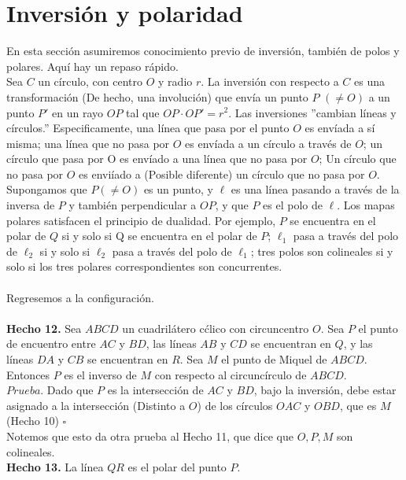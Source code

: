 \documentclass[11pt, a4paper]{article}
\begin{document}
	\setcounter{section}{6}
	\section{Inversi\'on y polaridad}
	En esta secci\'on asumiremos conocimiento previo de inversi\'on, tambi\'en de polos y polares. Aqu\'i hay un repaso r\'apido.
	\\
	Sea $C$ un c\'irculo, con centro $O$ y radio $r$. La inversi\'on con respecto a $C$ es una transformaci\'on (De hecho, una involuci\'on) que env\'ia un punto $P$ $(\ne O)$ a un punto $P'$ en un rayo $OP$ tal que $OP \cdot OP'=r^2$.
	\linebreak
	Las inversiones ''cambian l\'ineas y c\'irculos.'' Especificamente, una l\'inea que pasa por el punto $O$ es env\'iada a s\'i misma; una l\'inea que no pasa por $O$ es env\'iada a un c\'irculo a trav\'es de $O$; un c\'irculo que pasa por O es env\'iado a una l\'inea que no pasa por $O$; Un c\'irculo que no pasa por $O$ es envi\'iado a (Posible diferente) un c\'irculo que no pasa por $O$.
	\\
	Supongamos que $P(\ne O)$ es un punto, y $\ell$ es una l\'inea pasando a trav\'es de la inversa de $P$ y tambi\'en perpendicular a $OP$, y que $P$ es el polo de $\ell$. Los mapas polares satisfacen el principio de dualidad. Por ejemplo, $P$ se encuentra en el polar de $Q$ si y solo si Q se encuentra en el polar de $P$; $\ell_1$ pasa a trav\'es del polo de $\ell_2$ si y solo si $\ell_2$ pasa a trav\'es del polo de $\ell_1$; tres polos son colineales si y solo si los tres polares correspondientes son concurrentes.
	\\\\
	Regresemos a la configuraci\'on.
	\\\\
	\textbf{Hecho 12.} Sea $ABCD$ un cuadril\'atero c\'clico con circuncentro $O$. Sea $P$ el punto de encuentro entre $AC$ y $BD$, las l\'ineas $AB$ y $CD$ se encuentran en $Q$, y las l\'ineas $DA$ y $CB$ se encuentran en $R$. Sea $M$ el punto de Miquel de $ABCD$. Entonces $P$ es el inverso de $M$ con respecto al circunc\'irculo de $ABCD$.
	\\
	$Prueba$. Dado que $P$ es la intersecci\'on de $AC$ y $BD$, bajo la inversi\'on, debe estar asignado a la intersecci\'on (Distinto a $O$) de los c\'irculos $OAC$ y $OBD$, que es $M$ (Hecho 10) $\square$
	\\
	Notemos que esto da otra prueba al Hecho 11, que dice que $O, P, M$ son colineales.
	\\
	\textbf{Hecho 13.} La l\'inea $QR$ es el polar del punto $P$.
\end{document}

